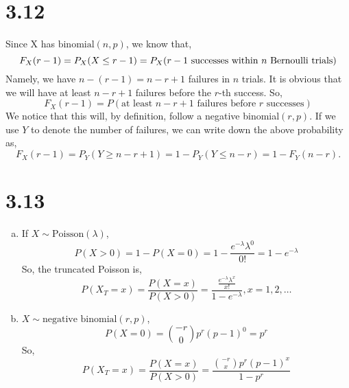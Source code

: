 \documentclass[letter]{article}
\begin{document}
    \section*{3.12}
    Since X has $\text{binomial}(n,p)$, we know that,
    \[
    F_X(r-1) = P_X(X \le r-1) = P_X(\text{$r-1$ successes within $n$ Bernoulli trials}) \\
    \]
    Namely, we have $n-(r-1) = n-r+1$ failures in $n$ trials. It is obvious that we will have at least $n-r+1$ failures before the $r$-th success.
    So,
    \[
    F_X(r-1) = P(\text{at least $n-r+1$ failures before $r$ successes})
    \]
    We notice that this will, by definition, follow a negative binomial$(r, p)$. If we use $Y$ to denote the number of failures, we can write down the above probability as,
    \[
    F_X(r-1) = P_Y(Y \ge n-r+1) = 1 - P_Y(Y \le n-r)  = 1- F_Y(n-r).
    \]
    \section*{3.13}
    \begin{enumerate}[(a)]
    \item If $X \sim \text{Poisson}(\lambda)$, 
    \[
    P(X > 0) = 1 - P(X = 0) = 1 - \frac{e^{-\lambda} \lambda^0}{0!} = 1 - e^{-\lambda}
    \]
    So, the truncated Poisson is,
    \[
    P(X_T = x) = \frac{P(X=x)}{P(X > 0)} = \frac{\frac{e^{-\lambda} \lambda^x}{x!}}{1-e^{-\lambda}}, x = 1, 2, \dots
    \]
    \item $X \sim \text{negative binomial}(r, p)$,
    \[
    P(X = 0) = \binom{-r}{0} p^r(p-1)^0 = p^r
    \]
    So,
    \[
    P(X_T = x) = \frac{P(X=x)}{P(X > 0)} = \frac{\binom{-r}{x} p^r (p-1)^x}{1-p^r}
    \]
    \end{enumerate}
\end{document}
